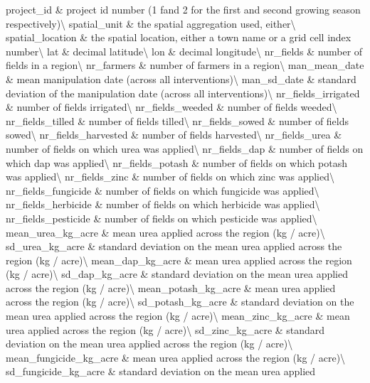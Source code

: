 \documentclass[
  landscape]{article}
\begin{document}
project\_id \& project id number (1 fand 2 for the first and second
growing season respectively)\textbackslash{} spatial\_unit \& the
spatial aggregation used, either\textbackslash{} spatial\_location \&
the spatial location, either a town name or a grid cell index
number\textbackslash{} lat \& decimal latitude\textbackslash{} lon \&
decimal longitude\textbackslash{} \addlinespace nr\_fields \& number of
fields in a region\textbackslash{} nr\_farmers \& number of farmers in a
region\textbackslash{} man\_mean\_date \& mean manipulation date (across
all interventions)\textbackslash{} man\_sd\_date \& standard deviation
of the manipulation date (across all interventions)\textbackslash{}
nr\_fields\_irrigated \& number of fields irrigated\textbackslash{}
\addlinespace nr\_fields\_weeded \& number of fields
weeded\textbackslash{} nr\_fields\_tilled \& number of fields
tilled\textbackslash{} nr\_fields\_sowed \& number of fields
sowed\textbackslash{} nr\_fields\_harvested \& number of fields
harvested\textbackslash{} nr\_fields\_urea \& number of fields on which
urea was applied\textbackslash{} \addlinespace nr\_fields\_dap \& number
of fields on which dap was applied\textbackslash{} nr\_fields\_potash \&
number of fields on which potash was applied\textbackslash{}
nr\_fields\_zinc \& number of fields on which zinc was
applied\textbackslash{} nr\_fields\_fungicide \& number of fields on
which fungicide was applied\textbackslash{} nr\_fields\_herbicide \&
number of fields on which herbicide was applied\textbackslash{}
\addlinespace nr\_fields\_pesticide \& number of fields on which
pesticide was applied\textbackslash{} mean\_urea\_kg\_acre \& mean urea
applied across the region (kg / acre)\textbackslash{} sd\_urea\_kg\_acre
\& standard deviation on the mean urea applied across the region (kg /
acre)\textbackslash{} mean\_dap\_kg\_acre \& mean urea applied across
the region (kg / acre)\textbackslash{} sd\_dap\_kg\_acre \& standard
deviation on the mean urea applied across the region (kg /
acre)\textbackslash{} \addlinespace mean\_potash\_kg\_acre \& mean urea
applied across the region (kg / acre)\textbackslash{}
sd\_potash\_kg\_acre \& standard deviation on the mean urea applied
across the region (kg / acre)\textbackslash{} mean\_zinc\_kg\_acre \&
mean urea applied across the region (kg / acre)\textbackslash{}
sd\_zinc\_kg\_acre \& standard deviation on the mean urea applied across
the region (kg / acre)\textbackslash{} mean\_fungicide\_kg\_acre \& mean
urea applied across the region (kg / acre)\textbackslash{} \addlinespace
sd\_fungicide\_kg\_acre \& standard deviation on the mean urea applied
\end{document}
